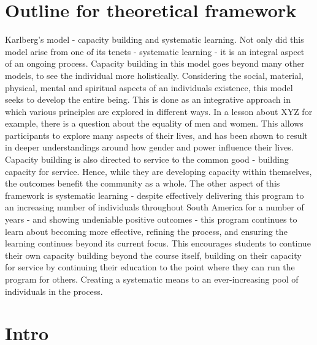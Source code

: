 \section{Outline for theoretical framework}

Karlberg's model - capacity building and systematic learning.
Not only did this model arise from one of its tenets - systematic learning - it is an integral aspect of an ongoing process. 
Capacity building in this model goes beyond many other models, to see the individual more holistically. Considering the social, material, physical, mental and spiritual aspects of an individuals existence, this model seeks to develop the entire being. This is done as an integrative approach in which various principles are explored in different ways. In a lesson about XYZ for example, there is a question about the equality of men and women. This allows participants to explore many aspects of their lives, and has been shown to result in deeper understandings around how gender and power influence their lives. 
Capacity building is also directed to service to the common good - building capacity for service. Hence, while they are developing capacity within themselves, the outcomes benefit the community as a whole. 
The other aspect of this framework is systematic learning - despite effectively delivering this program to an increasing number of individuals throughout South America for a number of years - and showing undeniable positive outcomes - this program continues to learn about becoming more effective, refining the process, and ensuring the learning continues beyond its current focus. This encourages students to continue their own capacity building beyond the course itself, building on their capacity for service by continuing their education to the point where they can run the program for others. Creating a systematic means to an ever-increasing pool of individuals in the process. %


\section{Intro}


